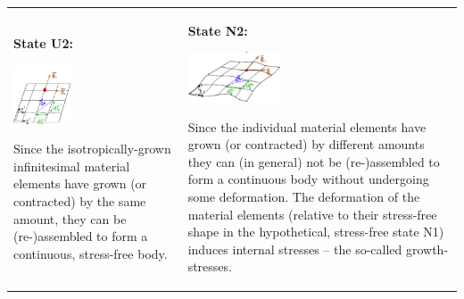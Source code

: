 \tabulinesep=1mm
\begin{longtabu} spread 0pt [c]{*{2}{|X[-1]}|}
\hline
\begin{center}{\bfseries State U2\+:}\end{center} 

 
\begin{DoxyImageNoCaption}
  \mbox{\includegraphics[width=0.35\textwidth]{Isotropic_growth_U2}}
\end{DoxyImageNoCaption}
 Since the isotropically-\/grown infinitesimal material elements have grown (or contracted) by the same amount, they can be (re-\/)assembled to form a continuous, stress-\/free body.  &\begin{center}{\bfseries State N2\+:}\end{center} 

 
\begin{DoxyImageNoCaption}
  \mbox{\includegraphics[width=0.35\textwidth]{Isotropic_growth_N2}}
\end{DoxyImageNoCaption}
 Since the individual material elements have grown (or contracted) by different amounts they can (in general) not be (re-\/)assembled to form a continuous body without undergoing some deformation. The deformation of the material elements (relative to their stress-\/free shape in the hypothetical, stress-\/free state N1) induces internal stresses -- the so-\/called growth-\/stresses.   \\
\end{longtabu}


